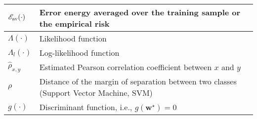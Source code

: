 \documentclass{article}
\begin{document}
\begin{xltabular}{\textwidth}{XX}
	\(\mathscr{E}_{\textnormal{av}}(\cdot)\)                                                                                                                                       & Error energy averaged over the training sample or the empirical risk  \cite{bishopPatternRecognitionMachine2006}                                                                                                                                                                                                                       \\ \hline
	\(\Lambda(\cdot)\)                                                                                                                                                             & Likelihood function                                                                                                                                                                                                                                                                                                                    \\ \hline
	\(\Lambda_l(\cdot)\)                                                                                                                                                           & Log-likelihood function                                                                                                                                                                                                                                                                                                                \\ \hline
	\(\hat{\rho}_{x,y}\)                                                                                                                                                           & Estimated Pearson correlation coefficient between \(x\) and \(y\)                                                                                                                                                                                                                                                                      \\ \hline
	\(\rho\)                                                                                                                                                                       & Distance of the margin of separation between two classes (Support Vector Machine, SVM)                                                                                                                                                                                                                                                 \\ \hline
	\(g(\cdot)\)                                                                                                                                                                   & Discriminant function, i.e., \(g(\mathbf{w}^{\star}) = 0\)
\end{xltabular}
\end{document}
